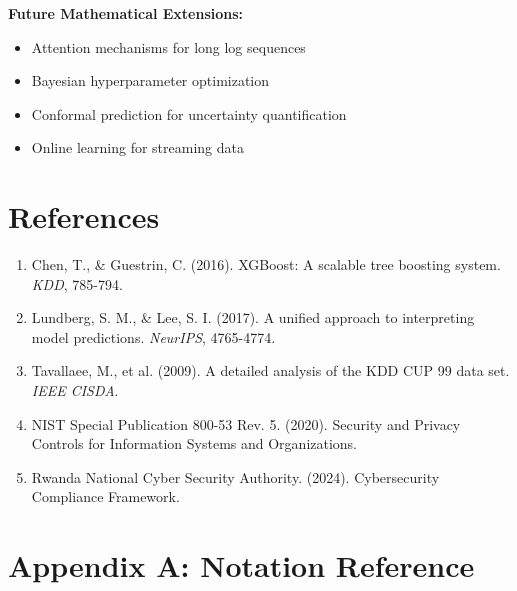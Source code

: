 \documentclass[12pt,a4paper]{article}
\begin{document}
\textbf{Future Mathematical Extensions:}
\begin{itemize}
    \item Attention mechanisms for long log sequences
    \item Bayesian hyperparameter optimization
    \item Conformal prediction for uncertainty quantification
    \item Online learning for streaming data
\end{itemize}

\section*{References}

\begin{enumerate}
    \item Chen, T., \& Guestrin, C. (2016). XGBoost: A scalable tree boosting system. \textit{KDD}, 785-794.

    \item Lundberg, S. M., \& Lee, S. I. (2017). A unified approach to interpreting model predictions. \textit{NeurIPS}, 4765-4774.

    \item Tavallaee, M., et al. (2009). A detailed analysis of the KDD CUP 99 data set. \textit{IEEE CISDA}.

    \item NIST Special Publication 800-53 Rev. 5. (2020). Security and Privacy Controls for Information Systems and Organizations.

    \item Rwanda National Cyber Security Authority. (2024). Cybersecurity Compliance Framework.
\end{enumerate}

\section*{Appendix A: Notation Reference}
\end{document}
